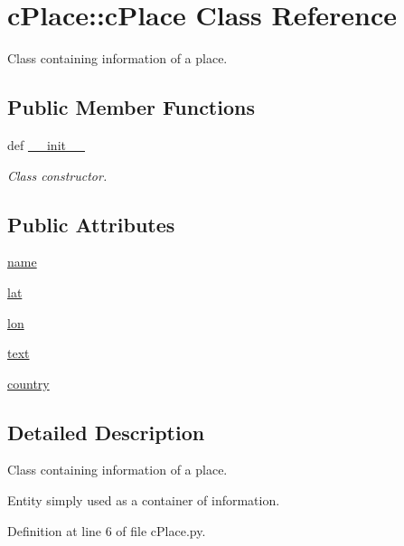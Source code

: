 \hypertarget{classcPlace_1_1cPlace}{\section{c\-Place\-:\-:c\-Place \-Class \-Reference}
\label{classcPlace_1_1cPlace}
}


\-Class containing information of a place.  


\subsection*{\-Public \-Member \-Functions}
\begin{DoxyCompactItemize}
\item 
def \hyperlink{classcPlace_1_1cPlace_ad3c4c45bb101418de02e6652dcc34f7b}{\-\_\-\-\_\-init\-\_\-\-\_\-}
\begin{DoxyCompactList}\small\item\em \-Class constructor. \end{DoxyCompactList}\end{DoxyCompactItemize}
\subsection*{\-Public \-Attributes}
\begin{DoxyCompactItemize}
\item 
\hyperlink{classcPlace_1_1cPlace_af91caa448be438c836129f377892e677}{name}
\item 
\hyperlink{classcPlace_1_1cPlace_aaf2f667c9f37b5a27c998f56f0bc99ba}{lat}
\item 
\hyperlink{classcPlace_1_1cPlace_a7798367307ce5a9c96b344f9bf291984}{lon}
\item 
\hyperlink{classcPlace_1_1cPlace_a379418fac881c01b5d36d9596ea3f9bb}{text}
\item 
\hyperlink{classcPlace_1_1cPlace_ac9bda2cceef9b3a18707d1864b0beb4f}{country}
\end{DoxyCompactItemize}


\subsection{\-Detailed \-Description}
\-Class containing information of a place. 

\-Entity simply used as a container of information. 

\-Definition at line 6 of file c\-Place.\-py.



